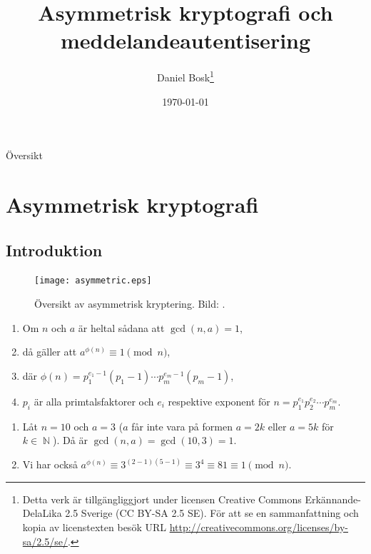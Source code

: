 \documentclass{beamer}
\title{%
  Asymmetrisk kryptografi och meddelandeautentisering
}
\author{Daniel Bosk\footnote{%
  Detta verk är tillgängliggjort under licensen Creative Commons 
  Erkännande-DelaLika 2.5 Sverige (CC BY-SA 2.5 SE).
	För att se en sammanfattning och kopia av licenstexten besök URL 
	\url{http://creativecommons.org/licenses/by-sa/2.5/se/}.
}}
\institute[MIUN IKS]{%
  Avdelningen för informations- och kommunikationssytem (IKS),\\
  Mittuniversitetet, SE-851\,70 Sundsvall.
}
\date{\today}
\theoremstyle{definition}
\DeclareMathOperator{\N}{\mathbb{N}}
\begin{document}
\begin{frame}
  \titlepage
\end{frame}

\begin{frame}{Översikt}
  \tableofcontents
\end{frame}






\section{Asymmetrisk kryptografi}

\subsection{Introduktion}

\begin{frame}{\insertsubsectionhead}
  \begin{figure}
    \texttt{[image: asymmetric.eps]}
    \caption{Översikt av asymmetrisk kryptering.
      Bild: \cite{Stallings2011can}.}
  \end{figure}
\end{frame}

\begin{frame}{\insertsubsectionhead}
  \begin{theorem}
    \begin{enumerate}
      \item Om \(n\) och \(a\) är heltal sådana att \(\gcd(n, a) = 1\),
      \item då gäller att \(a^{\phi(n)}\equiv 1\pmod n\),
      \item[] där \(\phi(n) = p_1^{e_1-1}(p_1-1)\cdots p_m^{e_m-1}(p_m-1)\),
      \item[] \(p_i\) är alla primtalsfaktorer och \(e_i\) respektive exponent 
        för \(n = p_1^{e_1} p_2^{e_2}\cdots p_m^{e_m}\).
    \end{enumerate}
  \end{theorem}
  \begin{example}
    \begin{enumerate}
      \item Låt \(n = 10\) och \(a = 3\) (\(a\) får inte vara på formen \(a = 
        2k\) eller \(a = 5k\) för \(k\in \N\)).
        Då är \(\gcd(n, a) = \gcd(10, 3) = 1\).
      \item Vi har också \(a^{\phi(n)}\equiv 3^{(2-1)(5-1)}\equiv 3^4\equiv 
        81\equiv 1\pmod n.\)
    \end{enumerate}
  \end{example}
\end{frame}
\end{document}

